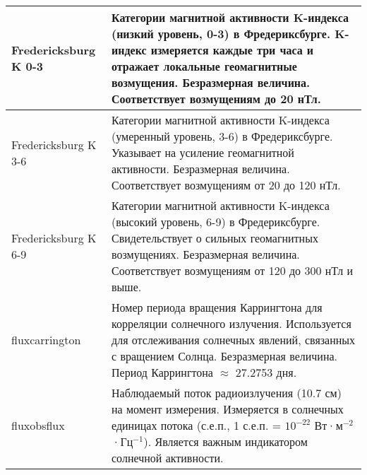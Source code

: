 \begin{longtable}{|l|p{12cm}|}
	\hline
	Fredericksburg K 0-3  & Категории магнитной активности K-индекса (низкий уровень, 0-3) в Фредериксбурге. K-индекс измеряется каждые три часа и отражает локальные геомагнитные возмущения. Безразмерная величина. Соответствует возмущениям до 20 нТл.                                                                                                                                                                                                                                                                                   \\
	\hline
	Fredericksburg K 3-6  & Категории магнитной активности K-индекса (умеренный уровень, 3-6) в Фредериксбурге. Указывает на усиление геомагнитной активности. Безразмерная величина. Соответствует возмущениям от 20 до 120 нТл.                                                                                                                                                                                                                                                                                                            \\
	\hline
	Fredericksburg K 6-9  & Категории магнитной активности K-индекса (высокий уровень, 6-9) в Фредериксбурге. Свидетельствует о сильных геомагнитных возмущениях. Безразмерная величина. Соответствует возмущениям от 120 до 300 нТл и выше.                                                                                                                                                                                                                                                                                                 \\
	\hline
	fluxcarrington        & Номер периода вращения Каррингтона для корреляции солнечного излучения. Используется для отслеживания солнечных явлений, связанных с вращением Солнца. Безразмерная величина. Период Каррингтона $\approx$ 27.2753 дня.                                                                                                                                                                                                                                                                                          \\
	\hline
	fluxobsflux           & Наблюдаемый поток радиоизлучения (10.7 см) на момент измерения. Измеряется в солнечных единицах потока (с.е.п., 1 с.е.п. = \(10^{-22}\) Вт·м\(^{-2}\)·Гц\(^{-1}\)). Является важным индикатором солнечной активности.                                                                                                                                                                                                                                                                                            \\

\end{longtable}
